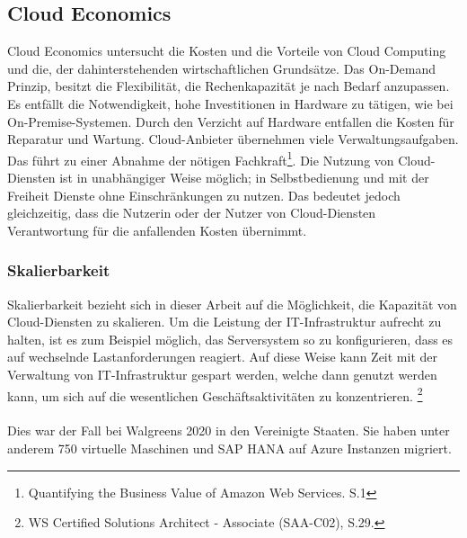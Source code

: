 \subsection{Cloud Economics}\label{subsec_UabsGrund3}
\begin{flushleft}
Cloud Economics untersucht die Kosten und die Vorteile von Cloud Computing und die, der dahinterstehenden wirtschaftlichen Grundsätze. Das On-Demand Prinzip, besitzt die Flexibilität, die Rechenkapazität je nach Bedarf anzupassen. Es entfällt die Notwendigkeit, hohe Investitionen in Hardware zu tätigen, wie bei On-Premise-Systemen.
Durch den Verzicht auf Hardware entfallen die Kosten für Reparatur und Wartung. Cloud-Anbieter übernehmen viele Verwaltungsaufgaben. Das führt zu einer Abnahme der nötigen Fachkraft\footnote{Quantifying the Business Value
of Amazon Web Services. S.1\cite{IDC01}}. Die Nutzung von Cloud-Diensten ist in unabhängiger Weise möglich; in Selbstbedienung und mit der Freiheit Dienste ohne Einschränkungen zu nutzen. Das bedeutet jedoch gleichzeitig, dass die Nutzerin oder der Nutzer von Cloud-Diensten Verantwortung für die anfallenden Kosten übernimmt.
\end{flushleft}

\subsubsection{Skalierbarkeit}
Skalierbarkeit bezieht sich in dieser Arbeit auf die Möglichkeit, die Kapazität von Cloud-Diensten zu skalieren. Um die Leistung der IT-Infrastruktur aufrecht zu halten, ist es zum Beispiel möglich, das Serversystem so zu konfigurieren, dass es auf wechselnde Lastanforderungen reagiert.
%
Auf diese Weise kann Zeit mit der Verwaltung von IT-Infrastruktur gespart werden, welche dann genutzt werden kann, um sich auf die wesentlichen Geschäftsaktivitäten zu konzentrieren.
\footnote{WS Certified Solutions Architect - Associate (SAA-C02), S.29.\cite{AWS1}}
\\\\
Dies war der Fall bei Walgreens 2020 in den Vereinigte Staaten.
Sie haben unter anderem 750 virtuelle Maschinen und SAP HANA auf Azure Instanzen migriert.

